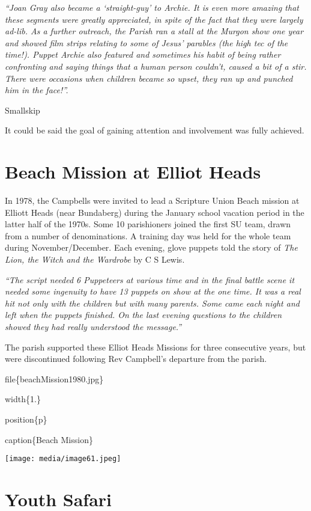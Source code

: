\emph{``Joan Gray also became a `straight-guy' to Archie. It is even more amazing that these segments were greatly appreciated, in spite of the fact that they were largely ad-lib. As a further outreach, the Parish ran a stall at the Murgon show one year and showed film strips relating to some of Jesus' parables (the high tec of the time!). Puppet Archie also featured and sometimes his habit of being rather confronting and saying things that a human person couldn't, caused a bit of a stir. There were occasions when children became so upset, they ran up and punched him in the face!''.}

Smallskip

It could be said the goal of gaining attention and involvement was fully achieved.

\hypertarget{beach-mission-at-elliot-heads}{%
\section{Beach Mission at Elliot Heads}\label{beach-mission-at-elliot-heads}}

In 1978, the Campbells were invited to lead a Scripture Union Beach mission at Elliott Heads (near Bundaberg) during the January school vacation period in the latter half of the 1970s. Some 10 parishioners joined the first SU team, drawn from a number of denominations. A training day was held for the whole team during November/December. Each evening, glove puppets told the story of \emph{The Lion, the Witch and the Wardrobe} by C S Lewis.

\emph{``The script needed 6 Puppeteers at various time and in the final battle scene it needed some ingenuity to have 13 puppets on show at the one time. It was a real hit not only with the children but with many parents. Some came each night and left when the puppets finished. On the last evening questions to the children showed they had really understood the message.''}

The parish supported these Elliot Heads Missions for three consecutive years, but were discontinued following Rev Campbell's departure from the parish.

file\{beachMission1980.jpg\}

width\{1.\}

position\{p\}

caption\{Beach Mission\}

\texttt{[image: media/image61.jpeg]}

\hypertarget{youth-safari}{%
\section{Youth Safari}\label{youth-safari}}

